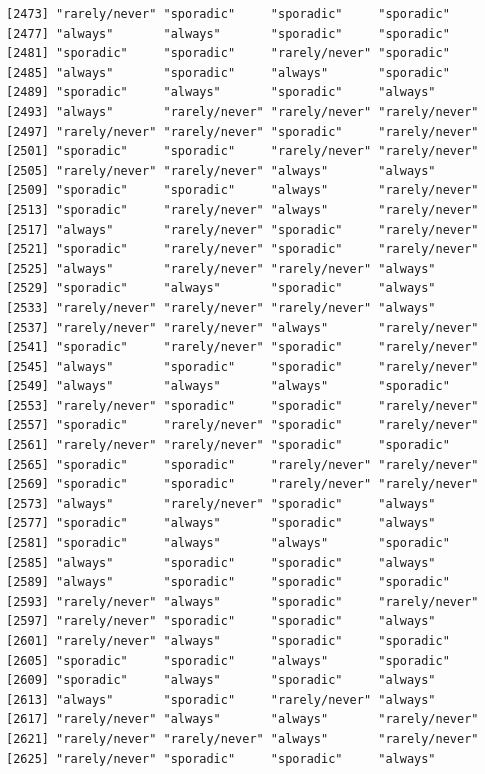 \documentclass[
  letterpaper,
  DIV=11,
  numbers=noendperiod]{scrartcl}
\begin{document}
\begin{verbatim}
[2473] "rarely/never" "sporadic"     "sporadic"     "sporadic"    
[2477] "always"       "always"       "sporadic"     "sporadic"    
[2481] "sporadic"     "sporadic"     "rarely/never" "sporadic"    
[2485] "always"       "sporadic"     "always"       "sporadic"    
[2489] "sporadic"     "always"       "sporadic"     "always"      
[2493] "always"       "rarely/never" "rarely/never" "rarely/never"
[2497] "rarely/never" "rarely/never" "sporadic"     "rarely/never"
[2501] "sporadic"     "sporadic"     "rarely/never" "rarely/never"
[2505] "rarely/never" "rarely/never" "always"       "always"      
[2509] "sporadic"     "sporadic"     "always"       "rarely/never"
[2513] "sporadic"     "rarely/never" "always"       "rarely/never"
[2517] "always"       "rarely/never" "sporadic"     "rarely/never"
[2521] "sporadic"     "rarely/never" "sporadic"     "rarely/never"
[2525] "always"       "rarely/never" "rarely/never" "always"      
[2529] "sporadic"     "always"       "sporadic"     "always"      
[2533] "rarely/never" "rarely/never" "rarely/never" "always"      
[2537] "rarely/never" "rarely/never" "always"       "rarely/never"
[2541] "sporadic"     "rarely/never" "sporadic"     "rarely/never"
[2545] "always"       "sporadic"     "sporadic"     "rarely/never"
[2549] "always"       "always"       "always"       "sporadic"    
[2553] "rarely/never" "sporadic"     "sporadic"     "rarely/never"
[2557] "sporadic"     "rarely/never" "sporadic"     "rarely/never"
[2561] "rarely/never" "rarely/never" "sporadic"     "sporadic"    
[2565] "sporadic"     "sporadic"     "rarely/never" "rarely/never"
[2569] "sporadic"     "sporadic"     "rarely/never" "rarely/never"
[2573] "always"       "rarely/never" "sporadic"     "always"      
[2577] "sporadic"     "always"       "sporadic"     "always"      
[2581] "sporadic"     "always"       "always"       "sporadic"    
[2585] "always"       "sporadic"     "sporadic"     "always"      
[2589] "always"       "sporadic"     "sporadic"     "sporadic"    
[2593] "rarely/never" "always"       "sporadic"     "rarely/never"
[2597] "rarely/never" "sporadic"     "sporadic"     "always"      
[2601] "rarely/never" "always"       "sporadic"     "sporadic"    
[2605] "sporadic"     "sporadic"     "always"       "sporadic"    
[2609] "sporadic"     "always"       "sporadic"     "always"      
[2613] "always"       "sporadic"     "rarely/never" "always"      
[2617] "rarely/never" "always"       "always"       "rarely/never"
[2621] "rarely/never" "rarely/never" "always"       "rarely/never"
[2625] "rarely/never" "sporadic"     "sporadic"     "always"      

\end{verbatim}
\end{document}
